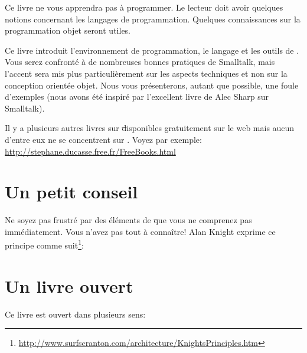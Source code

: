 \documentclass[a4paper,10pt,twoside]{book}
\begin{document}
Ce livre ne vous apprendra pas à programmer. Le lecteur doit avoir quelques 
notions concernant les langages de programmation. Quelques connaissances 
sur la programmation objet seront utiles.

Ce livre introduit l'environnement de programmation, le langage et
les outils de \pharo. Vous serez confronté à de nombreuses bonnes
pratiques de Smalltalk, mais l'accent sera mis plus particulièrement
sur les aspects techniques et non sur la conception orientée
objet. Nous vous présenterons, autant que possible, une foule 
d'exemples (nous avons été inspiré par l'excellent livre de Alec
Sharp sur Smalltalk\cite{Shar97a}).

Il y a plusieurs autres livres sur \st disponibles gratuitement 
sur le web mais aucun d'entre eux ne se concentrent sur \pharo. 
Voyez par exemple: \url{http://stephane.ducasse.free.fr/FreeBooks.html}

\ifluluelse{}{\newpage} %
\section*{Un petit conseil}


Ne soyez pas frustré par des éléments de \st que vous ne comprenez pas immédiatement.
Vous n'avez pas tout à connaître!
Alan Knight exprime ce principe comme suit\footnote{\url{http://www.surfscranton.com/architecture/KnightsPrinciples.htm}}:
\important{{\bf Ne vous en préoccupez pas!}%
\footnote{Dans sa version originale: ``Try not to care''.}
Les développeurs \st débutants ont souvent beaucoup de
difficultés car ils pensent qu'il est nécessaire de connaître
tous les détails d'une chose avant de l'utiliser. Cela signifie
qu'il leur faut un moment avant de maîtriser un 
simple: \ct{Transcript show: 'Hello World'}. 
Une des grandes avancées de la programmation par objets est de 
pouvoir répondre à la question ``Comment ceci marche?'' avec  ``Je ne m'en préoccupe pas''.}

\section*{Un livre ouvert}

Ce livre est ouvert dans plusieurs sens:
\end{document}
